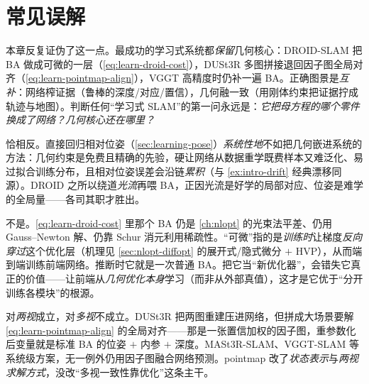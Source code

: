 \section{常见误解}
\label{sec:learning-myths}

\begin{pitfall}
本章反复证伪了这一点。最成功的学习式系统都\emph{保留}几何核心：DROID-SLAM 把 BA 做成可微的一层（\cref{eq:learn-droid-cost}），DUSt3R 多图拼接退回因子图全局对齐（\cref{eq:learn-pointmap-align}），VGGT 高精度时仍补一遍 BA。正确图景是\emph{互补}：网络榨证据（鲁棒的深度/对应/置信），几何融一致（用刚体约束把证据拧成轨迹与地图）。判断任何“学习式 SLAM”的第一问永远是：\emph{它把母方程的哪个零件换成了网络？几何核心还在哪里？}
\end{pitfall}

\begin{pitfall}
恰相反。直接回归相对位姿（\cref{sec:learning-pose}）\emph{系统性地}不如把几何嵌进系统的方法：几何约束是免费且精确的先验，硬让网络从数据重学既费样本又难泛化、易过拟合训练分布，且相对位姿误差会沿链\emph{累积}（与 \cref{ex:intro-drift} 经典漂移同源）。DROID 之所以绕道\emph{光流}再喂 BA，正因光流是好学的局部对应、位姿是难学的全局量——各司其职才胜出。
\end{pitfall}

\begin{pitfall}
不是。\cref{eq:learn-droid-cost} 里那个 BA 仍是 \cref{ch:nlopt} 的光束法平差、仍用 Gauss--Newton 解、仍靠 Schur 消元利用稀疏性。“可微”指的是\emph{训练时}让梯度\emph{反向穿过}这个优化层（机理见 \cref{sec:nlopt-diffopt} 的展开式/隐式微分 $+$ HVP），从而端到端训练前端网络。推断时它就是一次普通 BA。把它当“新优化器”，会错失它真正的价值——让前端从\emph{几何优化本身}学习（而非从外部真值），这才是它优于“分开训练各模块”的根源。
\end{pitfall}

\begin{pitfall}
对\emph{两视}成立，对\emph{多视}不成立。DUSt3R 把两图重建压进网络，但拼成大场景要解 \cref{eq:learn-pointmap-align} 的全局对齐——那是一张置信加权的因子图，重参数化后变量就是标准 BA 的位姿 $+$ 内参 $+$ 深度。MASt3R-SLAM、VGGT-SLAM 等系统级方案，无一例外仍用因子图融合网络预测。pointmap 改了\emph{状态表示}与\emph{两视求解方式}，没改“多视一致性靠优化”这条主干。
\end{pitfall}

